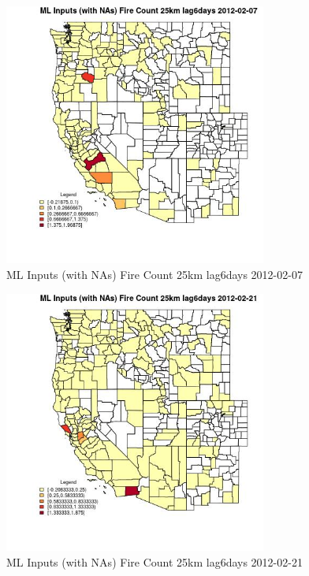 \begin{figure} 
\centering  
\includegraphics[width=0.77\textwidth]{Code_Outputs/Report_ML_input_PM25_Step4_part_f_de_duplicated_aveswNAs_CountyFire_Count_25km_lag6daysMean2012-02-07.jpg} 
\caption{\label{fig:Report_ML_input_PM25_Step4_part_f_de_duplicated_aveswNAsCountyFire_Count_25km_lag6daysMean2012-02-07}ML Inputs (with NAs) Fire Count 25km lag6days 2012-02-07} 
\end{figure} 
 

\begin{figure} 
\centering  
\includegraphics[width=0.77\textwidth]{Code_Outputs/Report_ML_input_PM25_Step4_part_f_de_duplicated_aveswNAs_CountyFire_Count_25km_lag6daysMean2012-02-21.jpg} 
\caption{\label{fig:Report_ML_input_PM25_Step4_part_f_de_duplicated_aveswNAsCountyFire_Count_25km_lag6daysMean2012-02-21}ML Inputs (with NAs) Fire Count 25km lag6days 2012-02-21} 
\end{figure} 
 


